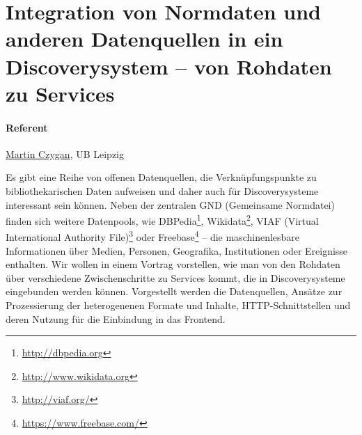 \documentclass[german]{article}
\author{
Martin Czygan \\
Leipzig University Library \\
Beethovenstra\ss{}e 6 \\
04107 Leipzig \\
martin.czygan@uni-leipzig.de
}
\begin{document}
\thispagestyle{empty}
\section*{Integration von Normdaten und anderen Datenquellen in ein Discoverysystem -- von Rohdaten zu Services}

\paragraph{Referent} \href{mailto:martin.czygan@uni-leipzig.de}{Martin Czygan}, UB Leipzig\\
\vspace{0.2cm}

Es gibt eine Reihe von offenen Datenquellen,
die Verknüpfungspunkte zu bibliothekarischen Daten aufweisen und daher
auch für Discoverysysteme interessant sein können. Neben der
zentralen GND (Gemeinsame Normdatei) finden sich weitere Datenpools,
wie DBPedia\footnote{\url{http://dbpedia.org}}, Wikidata\footnote{\url{http://www.wikidata.org}},
VIAF (Virtual International Authority File)\footnote{\url{http://viaf.org/}}
oder Freebase\footnote{\url{https://www.freebase.com/}} -- die maschinenlesbare
Informationen über Medien, Personen, Geografika, Institutionen oder Ereignisse
enthalten. Wir wollen in einem Vortrag vorstellen, wie man von den
Rohdaten über verschiedene Zwischenschritte zu Services kommt, die in
Discoverysysteme eingebunden werden können. Vorgestellt werden die Datenquellen,
Ansätze zur Prozessierung der heterogenenen Formate und Inhalte,
HTTP-Schnittstellen und deren Nutzung für die Einbindung in das Frontend.
\end{document}
